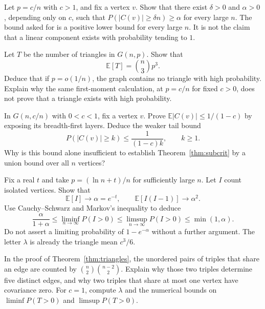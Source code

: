 \begin{exercise}[$\star\star\star$]\label{ex:giant}
Let $p=c/n$ with $c>1$, and fix a vertex $v$. Show that there exist $\delta>0$ and $\alpha>0$, depending only on $c$, such that $P(|C(v)|\ge\delta n)\ge\alpha$ for every large $n$. The bound asked for is a positive lower bound for every large $n$. It is not the claim that a linear component exists with probability tending to $1$.
\end{exercise}


\begin{exercise}[$\star$]\label{ex:trianglecount}
Let $T$ be the number of triangles in $G(n,p)$. Show that
\[
 \mathbb E[T]=\binom n3 p^3.
\]
Deduce that if $p=o(1/n)$, the graph contains no triangle with high probability. Explain why the same first-moment calculation, at $p=c/n$ for fixed $c>0$, does not prove that a triangle exists with high probability.
\end{exercise}

\begin{exercise}[$\star\star$]\label{ex:susceptibility}
In $G(n,c/n)$ with $0<c<1$, fix a vertex $v$. Prove $\mathbb E|C(v)|\le1/(1-c)$ by exposing its breadth-first layers. Deduce the weaker tail bound
\[
 P(|C(v)|\ge k)\le\frac{1}{(1-c)k},\qquad k\ge1.
\]
Why is this bound alone insufficient to establish Theorem~\ref{thm:subcrit} by a union bound over all $n$ vertices?
\end{exercise}

\begin{exercise}[$\star\star\star$]\label{ex:criticalisolated}
Fix a real $t$ and take $p=(\ln n+t)/n$ for sufficiently large $n$. Let $I$ count isolated vertices. Show that
\[
 \mathbb E[I]\longrightarrow\alpha=e^{-t},
 \qquad
 \mathbb E[I(I-1)]\longrightarrow\alpha^2.
\]
Use Cauchy--Schwarz and Markov's inequality to deduce
\[
 \frac{\alpha}{1+\alpha}
 \le\liminf_{n\to\infty}P(I>0)
 \le\limsup_{n\to\infty}P(I>0)
 \le\min(1,\alpha).
\]
Do not assert a limiting probability of $1-e^{-\alpha}$ without a further argument. The letter $\lambda$ is already the triangle mean $c^3/6$.
\end{exercise}

\begin{exercise}[$\star\star$]\label{ex:trianglesecond}
In the proof of Theorem~\ref{thm:triangles}, the unordered pairs of triples that share an edge are counted by $\binom{n}{2}\binom{n-2}{2}$. Explain why those two triples determine five distinct edges, and why two triples that share at most one vertex have covariance zero. For $c=1$, compute $\lambda$ and the numerical bounds on $\liminf P(T>0)$ and $\limsup P(T>0)$.
\end{exercise}

